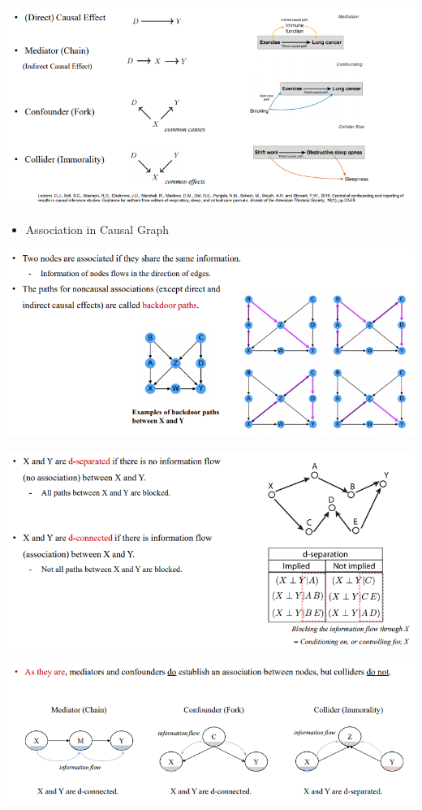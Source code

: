 \documentclass[
]{book}
\providecommand{\tightlist}{%
  \setlength{\itemsep}{0pt}\setlength{\parskip}{0pt}}
\theoremstyle{definition}
\theoremstyle{definition}
\theoremstyle{definition}
\theoremstyle{definition}
\theoremstyle{remark}
\begin{document}
\includegraphics{figures/35.png}

\begin{itemize}
\tightlist
\item
  Association in Causal Graph
\end{itemize}

\includegraphics{figures/36.png}

\includegraphics{figures/37.png}

\includegraphics{figures/38.png}
\end{document}
